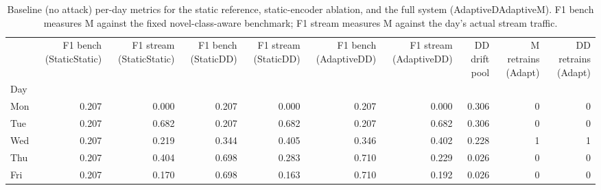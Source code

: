 \begin{table}
\caption{Baseline (no attack) per-day metrics for the static reference, static-encoder ablation, and the full system (AdaptiveDAdaptiveM). F1 bench measures M against the fixed novel-class-aware benchmark; F1 stream measures M against the day's actual stream traffic.}
\label{tab:baseline-adaptation}
\begin{tabular}{lrrrrrrrrr}
\toprule
 & F1 bench (StaticStatic) & F1 stream (StaticStatic) & F1 bench (StaticDD) & F1 stream (StaticDD) & F1 bench (AdaptiveDD) & F1 stream (AdaptiveDD) & DD drift pool & M retrains (Adapt) & DD retrains (Adapt) \\
Day &  &  &  &  &  &  &  &  &  \\
\midrule
Mon & 0.207 & 0.000 & 0.207 & 0.000 & 0.207 & 0.000 & 0.306 & 0 & 0 \\
Tue & 0.207 & 0.682 & 0.207 & 0.682 & 0.207 & 0.682 & 0.306 & 0 & 0 \\
Wed & 0.207 & 0.219 & 0.344 & 0.405 & 0.346 & 0.402 & 0.228 & 1 & 1 \\
Thu & 0.207 & 0.404 & 0.698 & 0.283 & 0.710 & 0.229 & 0.026 & 0 & 0 \\
Fri & 0.207 & 0.170 & 0.698 & 0.163 & 0.710 & 0.192 & 0.026 & 0 & 0 \\
\bottomrule
\end{tabular}
\end{table}
